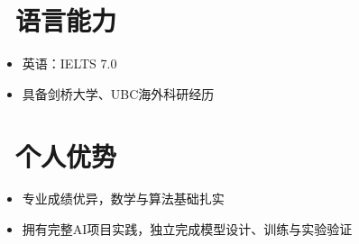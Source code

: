 \documentclass[11pt]{article}
\begin{document}
\section{\makebox[\widthof{\faLanguage}][c]{\color{CVBlue}\faLanguage}\ 语言能力}
\begin{itemize}[nosep]
    \item 英语：IELTS 7.0
    \item 具备剑桥大学、UBC海外科研经历
\end{itemize}

\section{\makebox[\widthof{\faStar}][c]{\color{CVBlue}\faStar}\ 个人优势}
\begin{itemize}[nosep]
    \item 专业成绩优异，数学与算法基础扎实
    \item 拥有完整AI项目实践，独立完成模型设计、训练与实验验证
\end{itemize}
\end{document}
